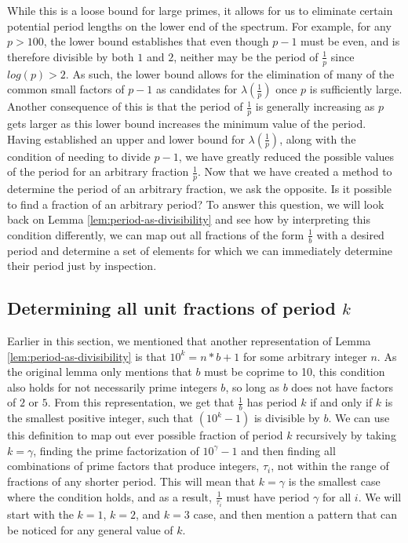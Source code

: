\documentclass[12pt]{amsart}
\theoremstyle{definition}
\theoremstyle{remark}
\begin{document}
While this is a loose bound for large primes, it allows for us to eliminate certain potential period lengths on the lower end of the spectrum. For example, for any $p>100$, the lower bound establishes that even though $p-1$ must be even, and is therefore divisible by both $1$ and $2$, neither may be the period of $\frac{1}{p}$ since $log(p)>2$. As such, the lower bound allows for the elimination of many of the common small factors of $p-1$ as candidates for $\lambda(\frac{1}{p})$ once $p$ is sufficiently large. Another consequence of this is that the period of $\frac{1}{p}$ is generally increasing as $p$ gets larger as this lower bound increases the minimum value of the period.\\

Having established an upper and lower bound for $\lambda(\frac{1}{p})$, along with the condition of needing to divide $p-1$, we have greatly reduced the possible values of the period for an arbitrary fraction $\frac{1}{p}$. Now that we have created a method to determine the period of an arbitrary fraction, we ask the opposite. Is it possible to find a fraction of an arbitrary period? To answer this question, we will look back on Lemma \ref{lem:period-as-divisibility} and see how by interpreting this condition differently, we can map out all fractions of the form $\frac{1}{b}$ with a desired period and determine a set of elements for which we can immediately determine their period just by inspection.\\

\subsection{Determining all unit fractions of period $k$}
Earlier in this section, we mentioned that another representation of Lemma \ref{lem:period-as-divisibility} is that $10^k=n*b+1$ for some arbitrary integer $n$. As the original lemma only mentions that $b$ must be coprime to 10, this condition also holds for not necessarily prime integers $b$, so long as $b$ does not have factors of $2$ or $5$. From this representation, we get that $\frac{1}{b}$ has period $k$ if and only if $k$ is the smallest positive integer, such that $(10^k-1)$ is divisible by $b$. We can use this definition to map out ever possible fraction of period $k$ recursively by taking $k=\gamma$, finding the prime factorization of $10^\gamma-1$ and then finding all combinations of prime factors that produce integers, $\tau_i$, not within the range of fractions of any shorter period. This will mean that $k=\gamma$ is the smallest case where the condition holds, and as a result, $\frac{1}{\tau_i}$ must have period $\gamma$ for all $i$. We will start with the $k=1$, $k=2$, and $k=3$ case, and then mention a pattern that can be noticed for any general value of $k$.
\end{document}

